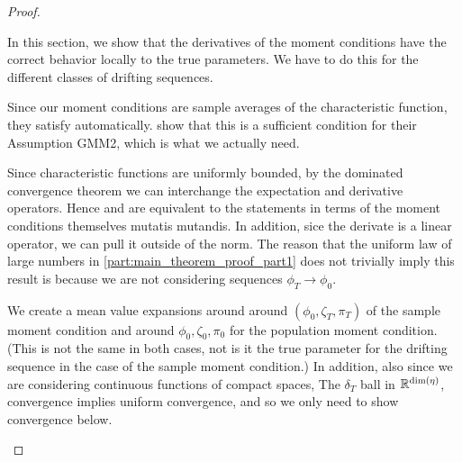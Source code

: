 \documentclass[11pt, letterpaper, twoside, final]{article}
\begin{document}
\begin{appendices}
\begin{proof}
\begin{proofpart}
\end{proofpart}


\begin{proofpart}
    \label{part:mainTheoremProofPart2}

    In this section, we show that the derivatives of the moment conditions have the correct behavior locally to
    the true parameters.
    We have to do this for the different classes of drifting sequences.

    Since our moment conditions are sample averages of the characteristic function, they satisfy
     automatically. 
    \textcite{andrews2014Gmm} show that this is a sufficient condition for their Assumption GMM2, which is what we
    actually need. 

    Since characteristic functions are uniformly bounded, by the dominated convergence theorem we can interchange the 
    expectation and derivative operators. 
    Hence  and  are equivalent to the statements in terms of the moment
    conditions themselves mutatis mutandis.  
    In addition, sice the derivate is a linear operator, we can pull it outside of the norm.
    The reason that the uniform law of large numbers in \cref{part:main_theorem_proof_part1} does not trivially
    imply this result is because we are not considering sequences $\phi_T \to \phi_0$. 


    We create a mean value expansions around around $(\phi_0, \zeta_T, \pi_T)$ of the sample moment condition and
    around $\phi_0, \zeta_0, \pi_0$ for the population moment condition.
    (This is not the same in both cases, not is it the true parameter for the drifting sequence in the case of the
    sample moment condition.)
    In addition, also since we are considering continuous functions of compact spaces, The $\delta_T$ ball in
    $\mathbb{R}^{\dim(\eta)}$, convergence implies uniform convergence, and so we only need to show convergence below.


\end{proofpart}
\end{proof}
\end{appendices}
\end{document}
